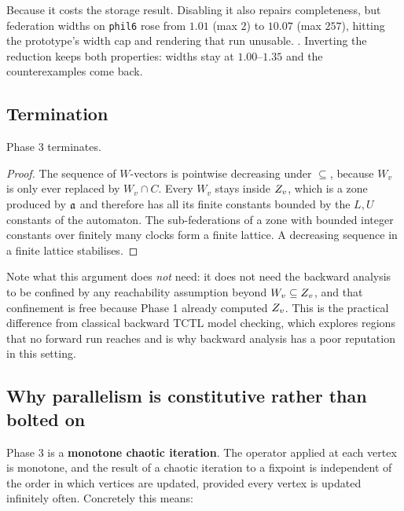 \begin{remark}
Because it costs the storage result. Disabling it also repairs completeness, but federation widths
on \texttt{phil6} rose from $1.01$ (max $2$) to $10.07$ (max $257$), hitting the prototype's width
cap and rendering that run unusable. \measured{}. Inverting the reduction keeps both properties:
widths stay at $1.00$--$1.35$ and the counterexamples come back.
\end{remark}

\subsection{Termination}

\begin{proposition}
\label{prop:term}
Phase 3 terminates. \proved{}
\end{proposition}

\begin{proof}
The sequence of $W$-vectors is pointwise decreasing under $\subseteq$, because $W_v$ is only ever
replaced by $W_v \cap C$. Every $W_v$ stays inside $Z_v$, which is a zone produced by $\mathfrak{a}$ and
therefore has all its finite constants bounded by the $L,U$ constants of the automaton. The
sub-federations of a zone with bounded integer constants over finitely many clocks form a finite
lattice. A decreasing sequence in a finite lattice stabilises.
\end{proof}

Note what this argument does \emph{not} need: it does not need the backward analysis to be confined
by any reachability assumption beyond $W_v \subseteq Z_v$, and that confinement is free because
Phase 1 already computed $Z_v$. This is the practical difference from classical backward TCTL
model checking, which explores regions that no forward run reaches and is why backward analysis has
a poor reputation in this setting.

\subsection{Why parallelism is constitutive rather than bolted on}
\label{sec:liveness:parallel}

Phase 3 is a \textbf{monotone chaotic iteration}. The operator applied at each vertex is monotone,
and the result of a chaotic iteration to a fixpoint is independent of the order in which vertices
are updated, provided every vertex is updated infinitely often. Concretely this means:

